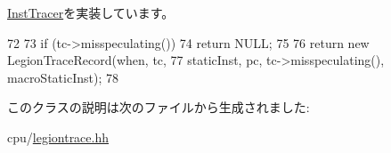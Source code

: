 \hyperlink{classTrace_1_1InstTracer_a4891aa2e596bcb475928d8fe1766a9df}{InstTracer}を実装しています。


\begin{DoxyCode}
72     {
73         if (tc->misspeculating())
74             return NULL;
75 
76         return new LegionTraceRecord(when, tc,
77                 staticInst, pc, tc->misspeculating(), macroStaticInst);
78     }
\end{DoxyCode}


このクラスの説明は次のファイルから生成されました:\begin{DoxyCompactItemize}
\item 
cpu/\hyperlink{legiontrace_8hh}{legiontrace.hh}\end{DoxyCompactItemize}
